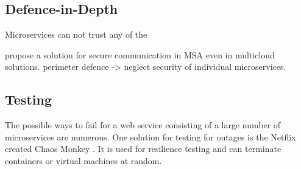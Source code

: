 \subsection{Defence-in-Depth}
\begin{sloppypar}
    Microservices can not trust any of the \citep{otterstad}
\end{sloppypar}
\begin{sloppypar}
    \citet{defdepau} propose a solution for secure communication in MSA even in 
    multicloud solutions. 
    perimeter defence -> neglect security of individual microservices.
\end{sloppypar}

\subsection{Testing}
\begin{sloppypar}
    The possible ways to fail for a web service consisting of a large number of 
    microservices are numerous. One solution for testing for outages is the 
    Netflix created Chaos Monkey \citep{chaosmonkey}. It is used for resilience 
    testing and can terminate containers or virtual machines at random.
\end{sloppypar}




